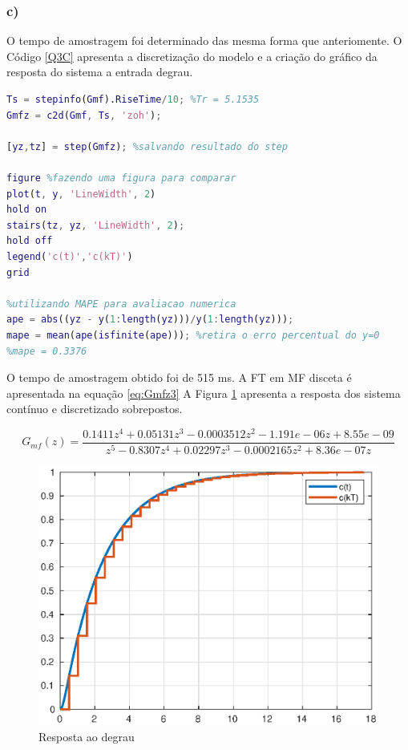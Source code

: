 \newpage
\subsubsection*{c)}

    O tempo de amostragem foi determinado das mesma forma que anteriomente. O Código \ref{Q3C} apresenta
    a discretização do modelo e a criação do gráfico da resposta do sistema a entrada degrau.

    \begin{lstlisting}[language=Matlab,label=Q3C,caption=Análise da estabilidade]
Ts = stepinfo(Gmf).RiseTime/10; %Tr = 5.1535
Gmfz = c2d(Gmf, Ts, 'zoh');

[yz,tz] = step(Gmfz); %salvando resultado do step

figure %fazendo uma figura para comparar
plot(t, y, 'LineWidth', 2)
hold on
stairs(tz, yz, 'LineWidth', 2);
hold off
legend('c(t)','c(kT)')
grid

%utilizando MAPE para avaliacao numerica
ape = abs((yz - y(1:length(yz)))/y(1:length(yz))); 
mape = mean(ape(isfinite(ape))); %retira o erro percentual do y=0
%mape = 0.3376
    \end{lstlisting}

    O tempo de amostragem obtido foi de 515 ms. A FT em MF disceta é apresentada na equação \ref{eq:Gmfz3}
    A Figura \ref{fig:Stepctd3} apresenta a resposta dos sistema contínuo e discretizado sobrepostos. 

    \begin{equation}
        G_{mf}(z) = \frac{0.1411 z^4 + 0.05131 z^3 - 0.0003512 z^2 - 1.191e-06 z + 8.55e-09}{z^5 - 0.8307 z^4 + 0.02297 z^3 - 0.0002165 z^2 + 8.36e-07 z }
        \label{eq:Gmfz3}
    \end{equation}

    \begin{figure}[!ht]
        \centering
        \includegraphics[width = 0.75\linewidth]{Figuras/ProblemasPI/Problema3/stepdiscreto.eps}
        \caption{Resposta ao degrau}
        \label{fig:Stepctd3}                   
    \end{figure}

